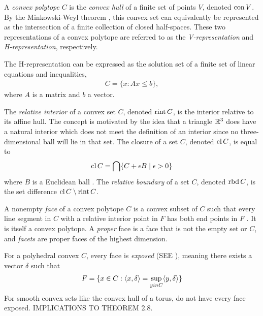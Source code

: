 A \emph{convex polytope} $C$ is the \emph{convex hull} of a finite set of points $V$, denoted $\operatorname{con} V$.
By the Minkowski-Weyl theorem \citep[Theorem 19.1]{Rockafellar:1970}, this convex 
set can equivalently be represented as the intersection of a finite collection of 
closed half-spaces.  These two representations of a convex polytope are referred to 
as the \emph{V-representation} and \emph{H-representation}, respectively.  

The H-representation can be expressed as the solution set of a finite set of linear 
equations and inequalities,
\begin{align*}
	C = \{x: Ax \leq b \},
\end{align*}
where $A$ is a matrix and $b$ a vector.

The \emph{relative interior} of a convex set $C$, denoted $\operatorname{rint} C$, is the interior 
relative to its affine hull.  The concept is motivated by the idea that a triangle
${\mathbb R}^3$ does have a natural interior which does not meet the definition of an interior
since no three-dimensional ball will lie in that set.  The closure of a set $C$, denoted $\operatorname{cl} C$, is equal to
\begin{align*}
	\operatorname{cl} C = \bigcap \{C + \epsilon B \mid \epsilon > 0 \}
\end{align*}
where $B$ is a Euclidean ball \citep{Rockafellar:1970}.  The \emph{relative boundary} of a set $C$, denoted $\operatorname{rbd} C$, is the set difference $\operatorname{cl} C \setminus \operatorname{rint} C$.

A nonempty \emph{face} of a convex polytope $C$ is a convex subset of $C$ such that 
every line segment in $C$ with a relative interior point in $F$ has 
both end points in $F$ \citep{Rockafellar:1970}.  It is itself a convex polytope.
A \emph{proper} face is a face that is not the empty set or $C$, and 
\emph{facets} are proper faces of the highest dimension.

For a polyhedral convex $C$, every face is \emph{exposed} (SEE \citep{Rockafellar:1970}), meaning there exists a vector $\delta$ such that
\begin{align*}
	F = \{ x \in C: \langle x, \delta \rangle = \sup_{y in C} \langle y,\delta \rangle  \}
\end{align*}
For smooth convex sets like the convex hull of a torus, do not have every face
exposed.  IMPLICATIONS TO THEOREM 2.8.


